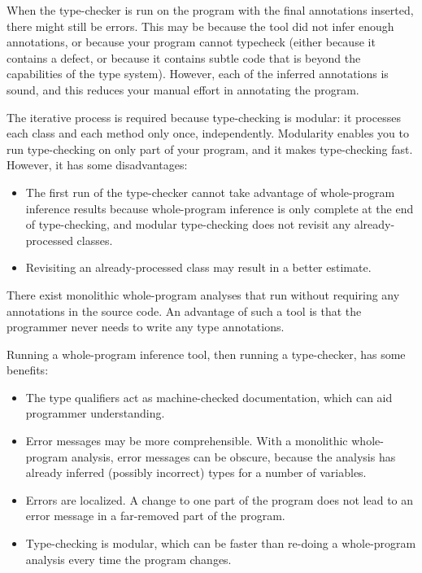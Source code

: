 When the type-checker is run on the program with the final annotations
inserted, there might still be errors.  This may be because the tool did
not infer enough annotations, or because your program cannot typecheck
(either because it contains a defect, or because it contains subtle code that
is beyond the capabilities of the type system).
However, each of the inferred annotations is sound, and this reduces your
manual effort in annotating the program.

The iterative process is required because type-checking is modular:  it
processes each class and each method only once, independently.  Modularity
enables you to run type-checking on only part of your program, and it makes
type-checking fast.  However, it has some disadvantages:
\begin{itemize}
\item
  The first run of the type-checker cannot take advantage of whole-program
  inference results because whole-program inference is only complete at the
  end of type-checking, and modular type-checking does not revisit any
  already-processed classes.
\item
  Revisiting an
  already-processed class may result in a better estimate.
\end{itemize}



There exist monolithic whole-program analyses that run without requiring any
annotations in the source code.  An advantage of such a tool is that the
programmer never needs to write any type annotations.

Running a whole-program inference tool, then running a type-checker, has
some benefits:
\begin{itemize}
\item
  The type qualifiers act as machine-checked documentation,
  which can aid programmer understanding.
\item
  Error messages may be more comprehensible.  With a monolithic
  whole-program analysis, error messages can be obscure, because the
  analysis has already inferred (possibly incorrect) types for a number of
  variables.
\item
  Errors are localized.  A change to one part of the program does not lead
  to an error message in a far-removed part of the program.
\item
  Type-checking is modular, which can be faster than re-doing a
  whole-program analysis every time the program changes.
\end{itemize}



